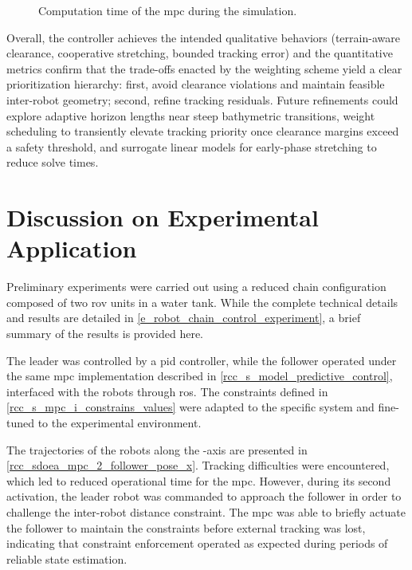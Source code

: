 \begin{figure}
	\centering
	\caption{Computation time of the \ac{mpc} during the simulation.}
	\label{rcc_s_mpc_r_compute_time}
\end{figure}

Overall, the controller achieves the intended qualitative behaviors (terrain-aware clearance,
cooperative stretching, bounded tracking error) and the quantitative metrics confirm that the
trade-offs enacted by the weighting scheme yield a clear prioritization hierarchy: first, avoid
clearance violations and maintain feasible inter-robot geometry; second, refine tracking residuals.
Future refinements could explore adaptive horizon lengths near steep bathymetric transitions,
weight scheduling to transiently elevate tracking priority once clearance margins exceed a safety
threshold, and surrogate linear models for early-phase stretching to reduce solve times.

\section{Discussion on Experimental Application}
\label{rcc_short_discussion_on_experimental_application}

Preliminary experiments were carried out using a reduced chain configuration composed of two
\ac{rov} units in a water tank. While the complete technical details and results are detailed
in \cref{e_robot_chain_control_experiment}, a brief summary of the results is provided here.

The leader was controlled by a \ac{pid} controller, while the follower operated under the same
\ac{mpc} implementation described in \cref{rcc_s_model_predictive_control}, interfaced with the
robots through \ac{ros}. The constraints defined in \cref{rcc_s_mpc_i_constrains_values} were
adapted to the specific system and fine-tuned to the experimental environment.

The trajectories of the robots along the -axis are presented in
\cref{rcc_sdoea_mpc_2_follower_pose_x}. Tracking difficulties were encountered, which led to
reduced operational time for the \ac{mpc}. However, during its second activation, the leader robot
was commanded to approach the follower in order to challenge the inter-robot distance constraint.
The \ac{mpc} was able to briefly actuate the follower to maintain the constraints before external
tracking was lost, indicating that constraint enforcement operated as expected during periods of
reliable state estimation.

